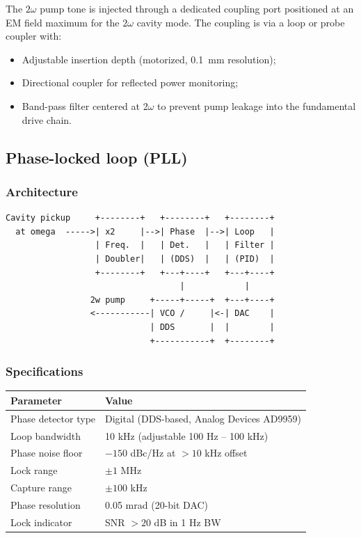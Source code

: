 \documentclass[12pt,letterpaper]{article}
\begin{document}
The $2\omega$ pump tone is injected through a dedicated coupling port
positioned at an EM field maximum for the $2\omega$ cavity mode.
The coupling is via a loop or probe coupler with:
\begin{itemize}[noitemsep]
  \item Adjustable insertion depth (motorized, 0.1~mm resolution);
  \item Directional coupler for reflected power monitoring;
  \item Band-pass filter centered at $2\omega$ to prevent pump leakage
    into the fundamental drive chain.
\end{itemize}

\subsection{Phase-locked loop (PLL)}

\subsubsection{Architecture}

\begin{verbatim}
Cavity pickup     +--------+   +--------+   +--------+
  at omega  ----->| x2     |-->| Phase  |-->| Loop   |
                  | Freq.  |   | Det.   |   | Filter |
                  | Doubler|   | (DDS)  |   | (PID)  |
                  +--------+   +---+----+   +---+----+
                                   |            |
                 2w pump     +-----+-----+  +---+----+
                 <-----------| VCO /     |<-| DAC    |
                             | DDS       |  |        |
                             +-----------+  +--------+
\end{verbatim}

\subsubsection{Specifications}

\begin{tabular}{ll}
\toprule
Parameter & Value \\
\midrule
Phase detector type & Digital (DDS-based, Analog Devices AD9959) \\
Loop bandwidth & 10 kHz (adjustable 100 Hz -- 100 kHz) \\
Phase noise floor & $-150$ dBc/Hz at $> 10$ kHz offset \\
Lock range & $\pm 1$ MHz \\
Capture range & $\pm 100$ kHz \\
Phase resolution & 0.05 mrad (20-bit DAC) \\
Lock indicator & SNR $> 20$ dB in 1 Hz BW \\
\bottomrule
\end{tabular}
\end{document}
